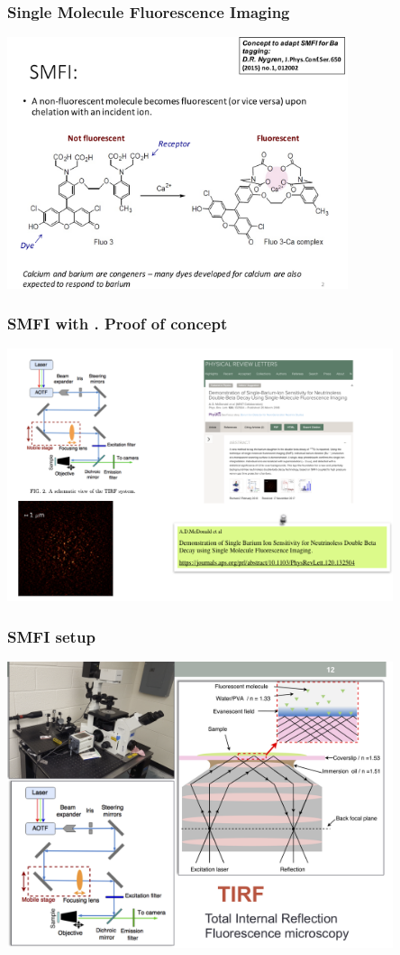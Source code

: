 \begin{frame}
\frametitle{Single Molecule Fluorescence Imaging}
  \begin{center}
      \includegraphics[width=0.75\textwidth]{moriond/smfi-concept.png}   
  \end{center}
\end{frame}

\begin{frame}
\frametitle{SMFI with \Bapp. Proof of concept}
  \begin{center}
      \includegraphics[width=0.85\textwidth]{moriond/sabat-poc.png}   
  \end{center}
\end{frame}

\begin{frame}
\frametitle{SMFI setup}
  \begin{center}
      \includegraphics[width=0.85\textwidth]{moriond/smfi-setup.png}   
  \end{center}
\end{frame}



